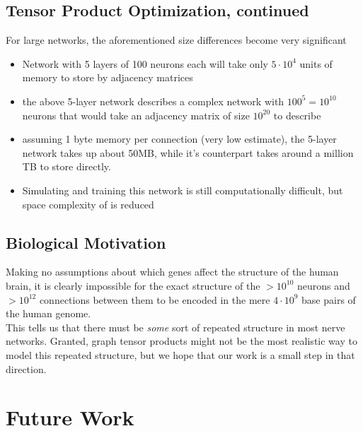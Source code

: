 \documentclass{article}
\begin{document}
\subsection{Tensor Product Optimization, continued}
For large networks, the aforementioned size differences become very significant
\begin{itemize}
    \item Network with 5 layers of 100 neurons each will take only $5 \cdot 10^4$ units of memory to store by adjacency matrices
    \item the above 5-layer network describes a complex network with $100^{5}=10^{10}$ neurons that would take an adjacency matrix of size $10^{20}$ to describe
    \item assuming 1 byte memory per connection (very low estimate), the 5-layer network takes up about 50MB, while it's counterpart takes around a million TB to store directly. 
    \item Simulating and training this network is still computationally difficult, but space complexity  of is reduced
\end{itemize}


\subsection{Biological Motivation}
Making no assumptions about which genes affect the structure of the human brain, it is clearly impossible for the exact structure of the $>10^{10}$ neurons and $>10^{12}$ connections between them to be encoded in the mere $4 \cdot 10^{9}$ base pairs of the human genome. \\
\vspace{1em}
This tells us that there must be \textit{some} sort of repeated structure in most nerve networks. Granted, graph tensor products might not be the most realistic way to model this repeated structure, but we hope that our work is a small step in that direction.



\section{Future Work}
\end{document}
